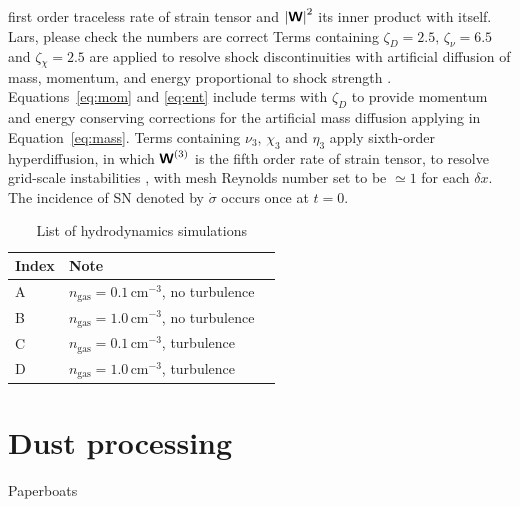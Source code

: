 \documentclass[fleqn,usenatbib]{mnras}
\newcommand{\fg}[1]{\textcolor{mypurple}{#1}}
\newcommand\dx{ {\delta x}}
\begin{document}
 first order traceless rate of strain tensor and $\left|{\textbf{\textsf{W}}}\right|^{2}$ its
 inner product with itself.
 \fg{Lars, please check the numbers are correct}
 Terms containing $\zeta_D{=2.5},\,\zeta_\nu{=6.5}$ and $\zeta{_\chi=2.5}$
 are applied to resolve shock discontinuities with artificial diffusion of
 mass, momentum, and energy proportional to shock strength
 \citep[see][for details]{GMKSH20}.
 Equations~\eqref{eq:mom} and \eqref{eq:ent} include terms with $\zeta_D$
 to provide momentum and energy conserving corrections for the
 artificial mass diffusion applying in Equation~\eqref{eq:mass}.
 Terms containing $\nu_3,\,\chi_3$ and $\eta_3$ apply sixth-order hyperdiffusion,
 in which ${\textbf{\textsf{W}}}^{(3)}$ is the fifth order rate of strain tensor, 
 to resolve grid-scale instabilities \citep[see, e.g.,][]{ABGS02,HB04,GMKS21},
 with mesh Reynolds number set to be $\simeq1$ for each $\dx$.
 The incidence of SN denoted by $\dot\sigma$ occurs once at $t=0$.






 \begin{table}
 \centering
 \caption{List of hydrodynamics simulations}
 \begin{tabular}{ l l l}
 \hline\hline
 Index&Note&\\\hline 
 A&$n_\text{gas}=0.1\,\text{cm}^{-3}$, no turbulence&\\\hline  
 B&$n_\text{gas}=1.0\,\text{cm}^{-3}$, no turbulence&\\\hline   
 C&$n_\text{gas}=0.1\,\text{cm}^{-3}$, turbulence&\\\hline  
 D&$n_\text{gas}=1.0\,\text{cm}^{-3}$, turbulence&\\\hline   
 \end{tabular}
 \label{List_hydrosimulations}
 \end{table}
 \newpage

\section{Dust processing}
Paperboats \citep{Kirchschlager2019, Kirchschlager2020}
 
\end{document}
